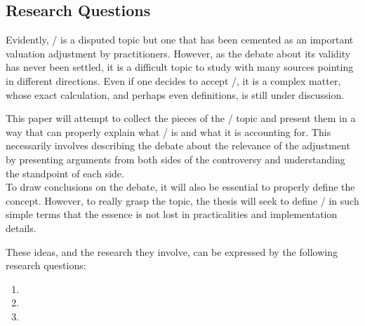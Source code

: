 \documentclass[main.tex]{subfiles}
\begin{document}
    \subsection{Research Questions}
        
    Evidently, \FVA/ is a disputed topic 
    but one that has been cemented as an important valuation adjustment by practitioners.
    However, as the debate about its validity has never been settled,
    it is a difficult topic to study with many sources pointing in different directions.
    Even if one decides to accept \FVA/, it is a complex matter,
    whose exact calculation, and perhaps even definitions, is still under discussion.

    This paper will attempt to collect the pieces of the \FVA/ topic
    and present them in a way that can properly explain what \FVA/ is and what it is accounting for.
    This necessarily involves describing the debate about the relevance of the adjustment
    by presenting arguments from both sides of the controversy 
    and understanding the standpoint of each side.
    \\
    To draw conclusions on the debate, it will also be essential to properly define the concept.
    However, to really grasp the topic, the thesis will seek to define \FVA/ in such simple terms 
    that the essence is not lost in practicalities and implementation details.

    These ideas, and the research they involve, can be expressed by the following research questions:
    \begin{enumerate}
        \item \researchQuestionFundingCosts
        \item \researchQuestionFvaDebate
        \item \researchQuestionFvaImplications
    \end{enumerate}
\end{document}
